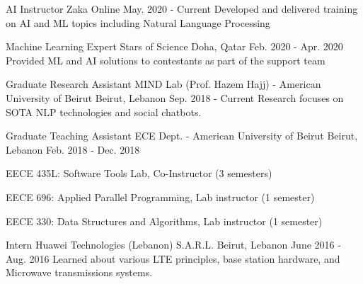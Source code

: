

\begin{cventries}

  \cventry
    {AI Instructor } %
    {Zaka} %
    {Online} %
    {May. 2020 - Current} %
    {Developed and delivered training on AI and ML topics including Natural Language Processing}

  \cventry
    {Machine Learning Expert} %
    {Stars of Science} %
    {Doha, Qatar} %
    {Feb. 2020 - Apr. 2020} %
    {Provided ML and AI solutions to contestants as part of the support team\smallskip}




  \cventry
    {Graduate Research Assistant} %
    {MIND Lab (Prof. Hazem Hajj) - American University of Beirut} %
    {Beirut, Lebanon} %
    {Sep. 2018 - Current} %
    {Research focuses on SOTA NLP technologies and social chatbots. }


  \cventry
    {Graduate Teaching Assistant} %
    {ECE Dept. - American University of Beirut} %
    {Beirut, Lebanon} %
    {Feb. 2018 - Dec. 2018} %
    { 
      \begin{cvitems} %
        \item {EECE 435L: Software Tools Lab, Co-Instructor (3 semesters)}
        \item {EECE 696: Applied Parallel Programming, Lab instructor (1 semester)}
        \item {EECE 330: Data Structures and Algorithms, Lab instructor (1 semester)}
      \end{cvitems}
    }

  \cventry
    {Intern} %
    {Huawei Technologies (Lebanon) S.A.R.L.} %
    {Beirut, Lebanon} %
    {June 2016  - Aug. 2016} %
    {Learned about various LTE principles, base station hardware, and Microwave transmissions systems.}


\end{cventries}
